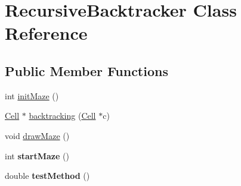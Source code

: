 \hypertarget{class_recursive_backtracker}{\section{Recursive\-Backtracker Class Reference}
\label{class_recursive_backtracker}
}
\subsection*{Public Member Functions}
\begin{DoxyCompactItemize}
\item 
int \hyperlink{class_recursive_backtracker_a114ae44592829d9ddd93f82985ac8cc3}{init\-Maze} ()
\item 
\hyperlink{struct_cell}{Cell} $\ast$ \hyperlink{class_recursive_backtracker_a9840a665c1569cc03d920dd92d883d87}{backtracking} (\hyperlink{struct_cell}{Cell} $\ast$c)
\item 
void \hyperlink{class_recursive_backtracker_af05c0897809de82fccdd276433f9aee7}{draw\-Maze} ()
\item 
\hypertarget{class_recursive_backtracker_a8f3059326aaee4f41b56d2f6efecfc11}{int {\bfseries start\-Maze} ()}\label{class_recursive_backtracker_a8f3059326aaee4f41b56d2f6efecfc11}

\item 
\hypertarget{class_recursive_backtracker_a78194dbc1284dbe435d87c5158491dcd}{double {\bfseries test\-Method} ()}\label{class_recursive_backtracker_a78194dbc1284dbe435d87c5158491dcd}

\end{DoxyCompactItemize}



